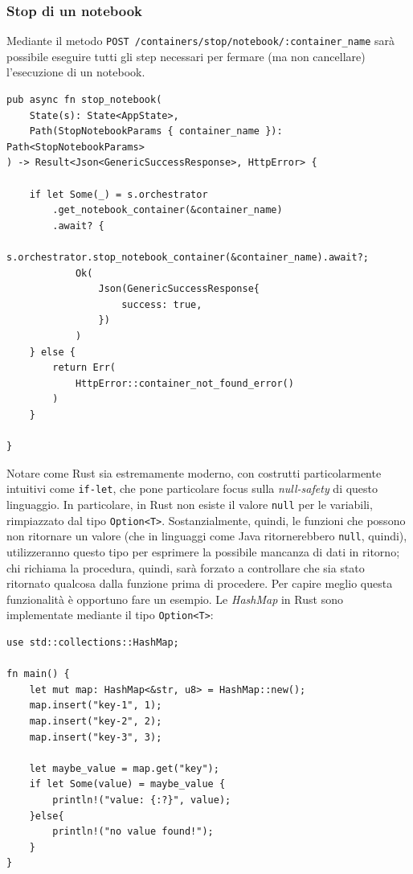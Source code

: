 \subsubsection{Stop di un notebook}
Mediante il metodo \verb|POST /containers/stop/notebook/:container_name| sarà possibile eseguire tutti gli step necessari per fermare (ma non cancellare) l'esecuzione di un notebook.
\begin{verbatim}
pub async fn stop_notebook(
    State(s): State<AppState>,
    Path(StopNotebookParams { container_name }): Path<StopNotebookParams>
) -> Result<Json<GenericSuccessResponse>, HttpError> {

    if let Some(_) = s.orchestrator
        .get_notebook_container(&container_name)
        .await? {
            s.orchestrator.stop_notebook_container(&container_name).await?;
            Ok(
                Json(GenericSuccessResponse{
                    success: true,
                })
            )
    } else {
        return Err(
            HttpError::container_not_found_error()
        )
    }
    
}
\end{verbatim}
Notare come Rust sia estremamente moderno, con costrutti particolarmente intuitivi come \verb|if-let|, che pone particolare focus sulla \textit{null-safety} di questo linguaggio. 
\newline
In particolare, in Rust non esiste il valore \verb|null| per le variabili, rimpiazzato dal tipo \verb|Option<T>|. Sostanzialmente, quindi, le funzioni che possono non ritornare un valore (che in linguaggi come Java ritornerebbero \verb|null|, quindi), utilizzeranno questo tipo per esprimere la possibile mancanza di dati in ritorno; chi richiama la procedura, quindi, sarà forzato a controllare che sia stato ritornato qualcosa dalla funzione prima di procedere. 
\newline
Per capire meglio questa funzionalità è opportuno fare un esempio.
\newline
Le \textit{HashMap} in Rust sono implementate mediante il tipo \verb|Option<T>|:
\begin{verbatim}
use std::collections::HashMap;

fn main() {
    let mut map: HashMap<&str, u8> = HashMap::new();
    map.insert("key-1", 1);
    map.insert("key-2", 2);
    map.insert("key-3", 3);

    let maybe_value = map.get("key");
    if let Some(value) = maybe_value {
        println!("value: {:?}", value);
    }else{
        println!("no value found!");
    }
}
\end{verbatim}
